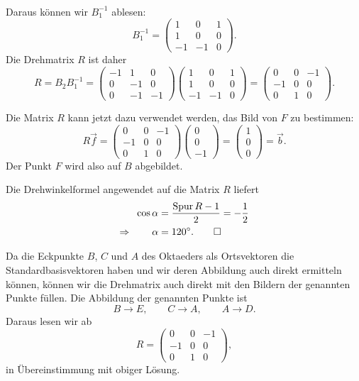 \begin{loesung}
\begin{teilaufgaben}
\begin{align*}
\end{align*}
Daraus können wir $B_1^{-1}$ ablesen:
\[
B_1^{-1}
=
\begin{pmatrix}
 1& 0& 1\\
 1& 0& 0\\
-1&-1& 0
\end{pmatrix}.
\]
Die Drehmatrix $R$ ist daher
\[
R
=
B_2B_1^{-1}
=
\begin{pmatrix}
-1& 1& 0\\
 0&-1& 0\\
 0&-1&-1
\end{pmatrix}
\begin{pmatrix}
 1& 0& 1\\
 1& 0& 0\\
-1&-1& 0
\end{pmatrix}
=
\begin{pmatrix}
 0& 0&-1\\
-1& 0& 0\\
 0& 1& 0
\end{pmatrix}.
\]
\item
Die Matrix $R$ kann jetzt dazu verwendet werden, das Bild von $F$ zu bestimmen:
\[
R\vec f
=
\begin{pmatrix}
 0& 0&-1\\
-1& 0& 0\\
 0& 1& 0
\end{pmatrix}
\begin{pmatrix}0\\0\\-1\end{pmatrix}
=
\begin{pmatrix}1\\0\\0\end{pmatrix}
=
\vec{b}.
\]
Der Punkt $F$ wird also auf $B$ abgebildet.
\item
Die Drehwinkelformel angewendet auf die Matrix $R$ liefert
\begin{align*}
\cos\alpha
&=
\frac{\operatorname{Spur}R-1}{2}
=
-\frac12
\\
\Rightarrow\qquad
\alpha
&=
120^\circ.
\qedhere
\end{align*}
\end{teilaufgaben}
\end{loesung}

\begin{diskussion}
Da die Eckpunkte $B$, $C$ und $A$ des Oktaeders als Ortsvektoren die
Standardbasisvektoren haben und wir deren Abbildung auch direkt ermitteln
können, können wir die Drehmatrix auch direkt mit den Bildern der
genannten Punkte füllen.
Die Abbildung der genannten Punkte ist
\[
B\rightarrow E,\qquad
C\rightarrow A,\qquad
A\rightarrow D.
\]
Daraus lesen wir ab
\[
R
=
\begin{pmatrix}
 0& 0&-1\\
-1& 0& 0\\
 0& 1& 0
\end{pmatrix},
\]
in Übereinstimmung mit obiger Lösung.
\end{diskussion}

